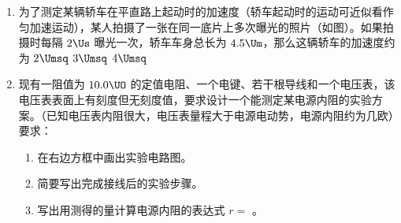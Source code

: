 \documentclass[\gkver]{gaokaozhenti}
\begin{document}
\begin{enumerate}
\item
为了测定某辆轿车在平直路上起动时的加速度（轿车起动时的运动可近似看作匀加速运动），某人拍摄了一张在同一底片上多次曝光的照片（如图）。如果拍摄时每隔 $2\Us$ 曝光一次，轿车车身总长为 $4.5\Um$，那么这辆轿车的加速度约为
\onepicture[w=12.69cm]{}
\fourchoices[answer=B]
{$1\Umsq$}
{$2\Umsq$}
{$3\Umsq$}
{$4\Umsq$}

\item
现有一阻值为 $10.0\UO$ 的定值电阻、一个电键、若干根导线和一个电压表，该电压表表面上有刻度但无刻度值，要求设计一个能测定某电源内阻的实验方案。（已知电压表内阻很大，电压表量程大于电源电动势，电源内阻约为几欧）要求：
\begin{enumerate}
	\item
	在右边方框中画出实验电路图。
	\item
	简要写出完成接线后的实验步骤。
	\item
	写出用测得的量计算电源内阻的表达式 $r =$ 。
\end{enumerate}


\end{enumerate}
\end{document}
